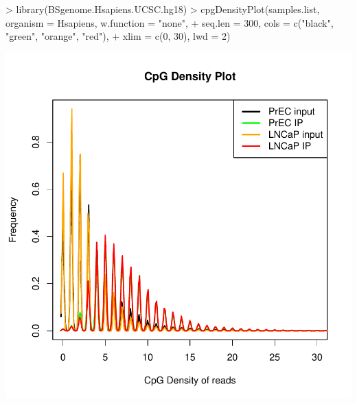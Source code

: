 \begin{Schunk}
\begin{Sinput}
> library(BSgenome.Hsapiens.UCSC.hg18)
> cpgDensityPlot(samples.list, organism = Hsapiens, w.function = "none", 
+     seq.len = 300, cols = c("black", "green", "orange", "red"), 
+     xlim = c(0, 30), lwd = 2)
\end{Sinput}
\end{Schunk}
\includegraphics{cpgPlot-cpgPlot}
